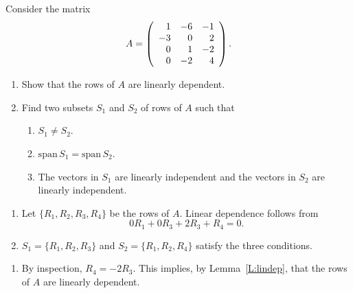 \documentclass{ximera}
\author{Matthew Carr \& Marty Golubitsky}
\begin{document}
\begin{exercise}\label{mc.exerciseErr6_M}
Consider the matrix
 \[
A=\left(\begin{array}{rrrrrrrrrrrrrrrrrr} 1 & -6 & -1 \\ -3 & 0 & 2 \\ 0 & 1 & -2 \\ 0 & -2 & 4 \end{array}\right)\ldotp
\]
\begin{enumerate}[label=(\alph*)]
\item Show that the rows of $A$ are  linearly dependent.
\item Find two subsets $S_1$ and $S_2$ of rows of $A$ such that 
\begin{enumerate}[label=(\roman*)]
	\item $S_1\ne S_2$.
	\item $\mathrm{span}\,S_1=\mathrm{span}\,S_2$. 
	\item The vectors in $S_1$ are linearly independent and the vectors in $S_2$ are linearly independent. 
	\end{enumerate}
\end{enumerate}

\begin{solution}
\ans 
\begin{enumerate}[label=(\alph*)]
\item Let $\{R_1,R_2,R_3,R_4\}$ be the rows of $A$.  Linear dependence follows from 
\[
0R_1 + 0R_3+2R_3+R_4 = 0.
\] 
\item $S_1=\{R_1,R_2,R_3\}$ and $S_2=\{R_1,R_2,R_4\}$ satisfy the three conditions.
\end{enumerate}

\soln 

\begin{enumerate}[label=(\alph*)]

\item By inspection, $R_4=-2R_3$. This implies, by Lemma~\ref{L:lindep}, that the rows of $A$ are linearly dependent. 


\end{enumerate}
\end{solution}
\end{exercise}
\end{document}
